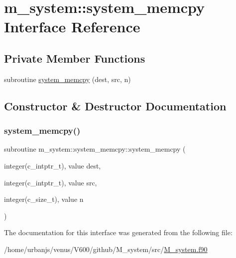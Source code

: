 \hypertarget{interfacem__system_1_1system__memcpy}{}\section{m\+\_\+system\+:\+:system\+\_\+memcpy Interface Reference}
\label{interfacem__system_1_1system__memcpy}
\subsection*{Private Member Functions}
\begin{DoxyCompactItemize}
\item 
subroutine \mbox{\hyperlink{interfacem__system_1_1system__memcpy_afd3a38389f0ab964fde33dcd8fbcdd8c}{system\+\_\+memcpy}} (dest, src, n)
\end{DoxyCompactItemize}


\subsection{Constructor \& Destructor Documentation}
\mbox{\label{interfacem__system_1_1system__memcpy_afd3a38389f0ab964fde33dcd8fbcdd8c}} 
\subsubsection{\texorpdfstring{system\+\_\+memcpy()}{system\_memcpy()}}
{\footnotesize\ttfamily subroutine m\+\_\+system\+::system\+\_\+memcpy\+::system\+\_\+memcpy (\begin{DoxyParamCaption}\item[{integer(c\+\_\+intptr\+\_\+t), value}]{dest,  }\item[{integer(c\+\_\+intptr\+\_\+t), value}]{src,  }\item[{integer(c\+\_\+size\+\_\+t), value}]{n }\end{DoxyParamCaption})\hspace{0.3cm}{\ttfamily [private]}}



The documentation for this interface was generated from the following file\+:\begin{DoxyCompactItemize}
\item 
/home/urbanjs/venus/\+V600/github/\+M\+\_\+system/src/\mbox{\hyperlink{M__system_8f90}{M\+\_\+system.\+f90}}\end{DoxyCompactItemize}
